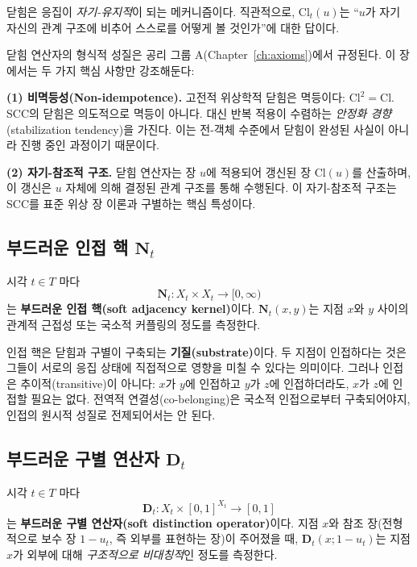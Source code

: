 닫힘은 응집이 \emph{자기-유지적}이 되는 메커니즘이다. 직관적으로, $\mathrm{Cl}_t(u)$는 ``$u$가 자기 자신의 관계 구조에 비추어 스스로를 어떻게 볼 것인가''에 대한 답이다.

닫힘 연산자의 형식적 성질은 공리 그룹 A(Chapter~\ref{ch:axioms})에서 규정된다. 이 장에서는 두 가지 핵심 사항만 강조해둔다:

\textbf{(1) 비멱등성(Non-idempotence).} 고전적 위상학적 닫힘은 멱등이다: $\mathrm{Cl}^2 = \mathrm{Cl}$. SCC의 닫힘은 의도적으로 멱등이 아니다. 대신 반복 적용이 수렴하는 \emph{안정화 경향}(stabilization tendency)을 가진다. 이는 전-객체 수준에서 닫힘이 완성된 사실이 아니라 진행 중인 과정이기 때문이다.

\textbf{(2) 자기-참조적 구조.} 닫힘 연산자는 장 $u$에 적용되어 갱신된 장 $\mathrm{Cl}(u)$를 산출하며, 이 갱신은 $u$ 자체에 의해 결정된 관계 구조를 통해 수행된다. 이 자기-참조적 구조는 SCC를 표준 위상 장 이론과 구별하는 핵심 특성이다.


\subsection{부드러운 인접 핵 $\mathbf{N}_t$}

시각 $t \in T$ 마다
\begin{equation}
    \mathbf{N}_t : X_t \times X_t \to [0, \infty)
    \label{eq:adjacency-kernel}
\end{equation}
는 \textbf{부드러운 인접 핵(soft adjacency kernel)}이다. $\mathbf{N}_t(x,y)$는 지점 $x$와 $y$ 사이의 관계적 근접성 또는 국소적 커플링의 정도를 측정한다.

인접 핵은 닫힘과 구별이 구축되는 \textbf{기질(substrate)}이다. 두 지점이 인접하다는 것은 그들이 서로의 응집 상태에 직접적으로 영향을 미칠 수 있다는 의미이다. 그러나 인접은 추이적(transitive)이 아니다: $x$가 $y$에 인접하고 $y$가 $z$에 인접하더라도, $x$가 $z$에 인접할 필요는 없다. 전역적 연결성(co-belonging)은 국소적 인접으로부터 구축되어야지, 인접의 원시적 성질로 전제되어서는 안 된다.


\subsection{부드러운 구별 연산자 $\mathbf{D}_t$}

시각 $t \in T$ 마다
\begin{equation}
    \mathbf{D}_t : X_t \times [0,1]^{X_t} \to [0,1]
    \label{eq:distinction-operator}
\end{equation}
는 \textbf{부드러운 구별 연산자(soft distinction operator)}이다. 지점 $x$와 참조 장(전형적으로 보수 장 $1 - u_t$, 즉 외부를 표현하는 장)이 주어졌을 때, $\mathbf{D}_t(x; 1-u_t)$는 지점 $x$가 외부에 대해 \emph{구조적으로 비대칭적}인 정도를 측정한다.

